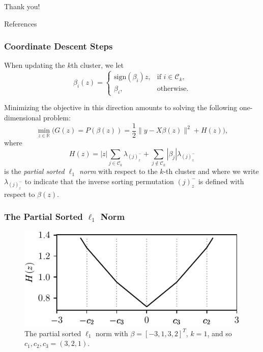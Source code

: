 \documentclass[10pt,aspectratio=169]{beamer}
\begin{document}
\begin{frame}[standout]
  Thank you!
\end{frame}


\appendix

\begin{frame}[allowframebreaks]{References}
  \printbibliography[heading=none]
\end{frame}

\begin{frame}
  \frametitle{Coordinate Descent Steps}

  When updating the \(k\)th cluster, we let
  \begin{equation*}
    \beta_i(z) =
    \begin{cases}
      \mathrm{sign}(\beta_i) z   , & \text{if } i \in \mathcal{C}_k, \\
      \beta_i,                     & \text{otherwise}.
    \end{cases}
  \end{equation*}

  \pause

  Minimizing the objective in this direction amounts to solving the following
  one-dimensional problem:
  \[
    \min_{z \in \mathbb{R}} \Big(
    G(z) = P(\beta(z))  = \frac{1}{2} \lVert y - X \beta(z)\rVert^2 + H(z)
    \Big),
  \]
  where
  \begin{equation*}
    H(z) = |z| \sum_{j \in \mathcal{C}_k} \lambda_{(j)^-_z}
    + \sum_{j \notin \mathcal{C}_k} |\beta_j| \lambda_{(j)^-_z}
  \end{equation*}
  is the \emph{partial sorted \(\ell_1\) norm} with respect to the \(k\)-th cluster and where we write \(\lambda_{(j)^-_z}\) to indicate that the inverse sorting permutation \((j)^-_z\)
  is defined with respect to \(\beta(z)\).
\end{frame}


\begin{frame}
  \frametitle{The Partial Sorted \(\ell_1\) Norm}

  \begin{figure}[htpb]
    \centering
    \includegraphics[scale=0.8]{figures/partial_slope.pdf}
    \caption{%
    The partial sorted \(\ell_1\) norm with \(\beta = [-3,1,3,2]^T\), \(k = 1\), and so
    \(c_1, c_2, c_3 = (3,2,1)\).
    }
  \end{figure}
\end{frame}
\end{document}
